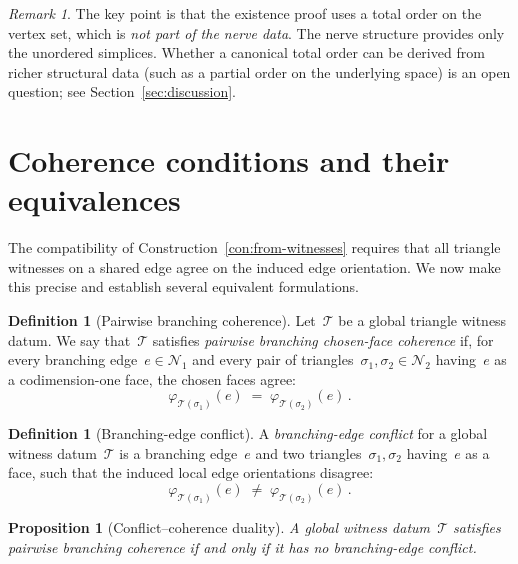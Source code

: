 \documentclass[11pt,a4paper]{article}
\theoremstyle{plain}
\newtheorem{proposition}[theorem]{Proposition}
\theoremstyle{definition}
\newtheorem{definition}[theorem]{Definition}
\theoremstyle{remark}
\newtheorem{remark}[theorem]{Remark}
\newcommand{\cN}{\mathcal{N}}
\newcommand{\cT}{\mathcal{T}}
\newcommand{\chosenface}{\varphi}
\begin{document}
\begin{remark}
\label{rem:noncanonical}
The key point is that the existence proof uses a total order on the
vertex set, which is \emph{not part of the nerve data}. The nerve
structure provides only the unordered simplices. Whether a canonical
total order can be derived from richer structural data (such as a
partial order on the underlying space) is an open question; see
Section~\ref{sec:discussion}.
\end{remark}

\section{Coherence conditions and their equivalences}
\label{sec:coherence}

The compatibility of Construction~\ref{con:from-witnesses} requires that
all triangle witnesses on a shared edge agree on the induced edge
orientation. We now make this precise and establish several equivalent
formulations.

\begin{definition}[Pairwise branching coherence]
\label{def:coherence}
Let~$\cT$ be a global triangle witness datum. We say that~$\cT$
satisfies \emph{pairwise branching chosen-face coherence} if, for every
branching edge~$e \in \cN_1$ and every pair of triangles~$\sigma_1,
\sigma_2 \in \cN_2$ having~$e$ as a codimension-one face, the chosen faces
agree:
\[
  \chosenface_{\cT(\sigma_1)}(e)
  \;=\; \chosenface_{\cT(\sigma_2)}(e)\,.
\]
\end{definition}

\begin{definition}[Branching-edge conflict]
\label{def:conflict}
A \emph{branching-edge conflict} for a global witness datum~$\cT$ is a
branching edge~$e$ and two triangles~$\sigma_1, \sigma_2$ having~$e$ as
a face, such that the induced local edge orientations disagree:
\[
  \chosenface_{\cT(\sigma_1)}(e)
  \;\neq\; \chosenface_{\cT(\sigma_2)}(e)\,.
\]
\end{definition}

\begin{proposition}[Conflict--coherence duality]
\label{prop:conflict-iff}
A global witness datum~$\cT$ satisfies pairwise branching coherence if
and only if it has no branching-edge conflict.
\end{proposition}
\end{document}
